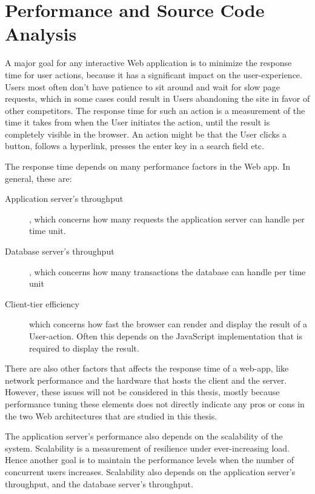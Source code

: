 \chapter{Performance and Source Code Analysis}
A major goal for any interactive Web application is to minimize the response time for user actions, because it has a significant impact on the user-experience. Users most often don't have patience to sit around and wait for slow page requests, which in some cases could result in Users abandoning the site in favor of other competitors.  The response time for such an action is a measurement of the time it takes from when the User initiates the action, until the result is completely visible in the browser. An action might be that the User clicks a button, follows a hyperlink, presses the enter key in a search field etc.

The response time depends on many performance factors in the Web app. In general, these are:
\begin{description}
\item[Application server's throughput], which concerns how many requests the application server can handle per time unit. 
\item [Database server's throughput], which concerns how many transactions the database can handle per time unit
\item[Client-tier efficiency] which concerns how fast the browser can render and display the result of a User-action. Often this depends on the JavaScript implementation that is required to display the result.
\end{description}
There are also other factors that affects the response time of a web-app, like network performance and the hardware that hosts the client and the server. However, these issues will not be considered in this thesis, mostly because performance tuning these elements does not directly indicate any pros or cons in the two Web architectures that are studied in this thesis. 

The application server's performance also depends on the scalability of the system. Scalability is a measurement of resilience under ever-increasing load. Hence another goal is to maintain the performance levels when the number of concurrent users increases. Scalability also depends on the application server's throughput, and the database server's throughput. 

